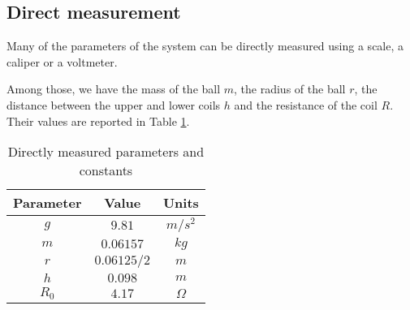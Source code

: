 \subsection{Direct measurement}
\label{subsec:direct_measurement}

Many of the parameters of the system can be directly measured using a scale, a caliper or a voltmeter.

Among those, we have the mass of the ball $m$, the radius of the ball $r$, the distance between the upper and lower coils $h$ and the resistance of the coil $R$.
Their values are reported in Table \ref{tab:directly_measured_parameters}.

\begin{table}[H]

    \centering
    \begin{tabular}{|c|c|c|}
        \hline
        \textbf{Parameter} & \textbf{Value} & \textbf{Units} \\
        \hline
        $g$                & $9.81$         & $m/s^2$        \\
        $m$                & $0.06157$      & $kg$           \\
        $r$                & $0.06125/2$    & $m$            \\
        $h$                & $0.098$        & $m$            \\
        $R_{0}$            & $4.17$         & $\Omega$       \\
        \hline
    \end{tabular}

    \caption{Directly measured parameters and constants}
    \label{tab:directly_measured_parameters}

\end{table}